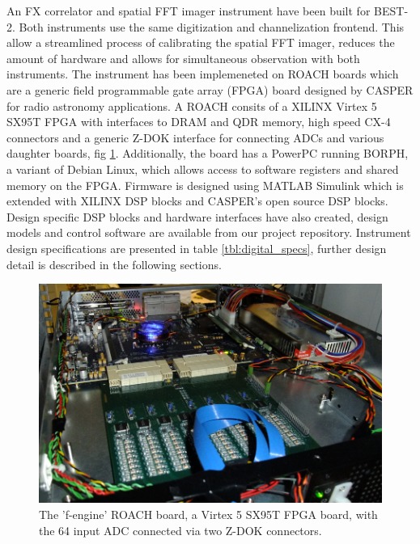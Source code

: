 \documentclass[useAMS,usenatbib,onecolumn]{mn2e}
\begin{document}
An FX correlator and spatial FFT imager instrument have been built for BEST-2.
Both instruments use the same digitization and channelization frontend.
This allow a streamlined process of calibrating the spatial FFT imager, reduces the amount of hardware and allows for simultaneous observation with both instruments.
The instrument has been implemeneted on ROACH boards which are a generic field programmable gate array (FPGA) board designed by CASPER for radio astronomy applications.
A ROACH consits of a XILINX Virtex 5 SX95T FPGA with interfaces to DRAM and QDR memory, high speed CX-4 connectors and a generic Z-DOK interface for connecting ADCs and various daughter boards, fig \ref{fig:roach}.
Additionally, the board has a PowerPC running BORPH, a variant of Debian Linux, which allows access to software registers and shared memory on the FPGA.
Firmware is designed using MATLAB Simulink which is extended with XILINX DSP blocks and CASPER's open source DSP blocks\citep{}.
Design specific DSP blocks and hardware interfaces have also created, design models and control software are available from our project repository\citep{}.
Instrument design specifications are presented in table \ref{tbl:digital_specs}, further design detail is described in the following sections.

\begin{figure}
    \centering
    \includegraphics[scale=0.4]{graphics/roach_feng.png}
    \caption{The 'f-engine' ROACH board, a Virtex 5 SX95T FPGA board, with the 64 input ADC connected via two Z-DOK connectors.}
    \label{fig:roach}
\end{figure}
\end{document}
